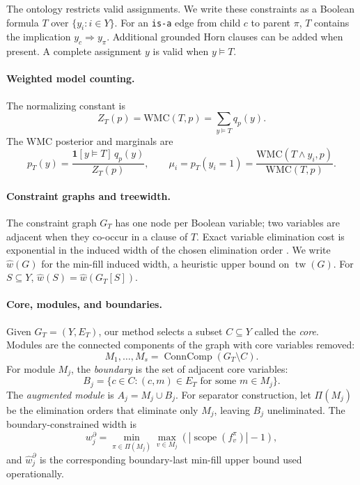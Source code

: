 \documentclass[12pt]{article}
\begin{document}
The ontology restricts valid assignments. We write these constraints as
a Boolean formula $T$ over $\{y_i:i\in Y\}$. For an \texttt{is-a} edge
from child $c$ to parent $\pi$, $T$ contains the implication
$y_c \Rightarrow y_\pi$.
Additional grounded Horn clauses can be added when present. A complete
assignment $y$ is valid when $y\models T$.

\paragraph{Weighted model counting.}
The normalizing constant is
\[
  Z_T(p) = \mathrm{WMC}(T,p) = \sum_{y\models T} q_p(y).
\]
The WMC posterior and marginals are
\[
  p_T(y) = \frac{\mathbf{1}[y\models T]\,q_p(y)}{Z_T(p)}, \qquad
  \mu_i = p_T(y_i=1) = \frac{\mathrm{WMC}(T\wedge y_i,p)}{\mathrm{WMC}(T,p)}.
\]

\paragraph{Constraint graphs and treewidth.}
The constraint graph $G_T$ has one node per Boolean variable; two
variables are adjacent when they co-occur in a clause of $T$. Exact
variable elimination cost is exponential in the induced width of the
chosen elimination order \citep{pearl1988probabilistic,
bodlaender1993treewidth}. We write $\widehat{w}(G)$ for the min-fill
induced width, a heuristic upper bound on $\operatorname{tw}(G)$. For
$S\subseteq Y$, $\widehat{w}(S) = \widehat{w}(G_T[S])$.

\paragraph{Core, modules, and boundaries.}
Given $G_T=(Y,E_T)$, our method selects a subset $C\subseteq Y$ called
the \emph{core}. Modules are the connected components of the graph with
core variables removed:
\[
  M_1,\ldots,M_s = \operatorname{ConnComp}(G_T\setminus C).
\]
For module $M_j$, the \emph{boundary} is the set of adjacent core
variables:
\[
  B_j = \{c\in C : (c,m)\in E_T \text{ for some } m\in M_j\}.
\]
The \emph{augmented module} is $A_j = M_j\cup B_j$. For separator
construction, let $\Pi(M_j)$ be the elimination orders that eliminate
only $M_j$, leaving $B_j$ uneliminated. The boundary-constrained width
is
\[
  w_j^\partial
  = \min_{\pi\in\Pi(M_j)}\max_{v\in M_j}
  \left(|\operatorname{scope}(f_v^\pi)|-1\right),
\]
and $\widehat{w}_j^\partial$ is the corresponding boundary-last min-fill
upper bound used operationally.
\end{document}
